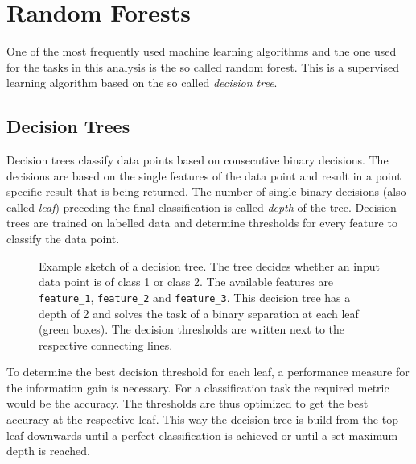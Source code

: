 \section{Random Forests}
%
One of the most frequently used machine learning algorithms and the one used
for the tasks in this analysis is the so called random forest. This is a
supervised learning algorithm based on the so called \textit{decision tree}.

\subsection{Decision Trees}
%
Decision trees classify data points based on consecutive binary decisions. The
decisions are based on the single features of the data point and result in a
point specific result that is being returned. The number of single binary
decisions (also called \textit{leaf}) preceding the final classification is
called \textit{depth} of the tree. Decision trees are trained on labelled data
and determine thresholds for every feature to classify the data point.
%
\begin{figure}[H]
  \centering
  \caption{Example sketch of a decision tree. The tree decides whether an input data point is of class 1 or class 2. The available features are \texttt{feature\_1}, \texttt{feature\_2} and \texttt{feature\_3}. This decision tree has a depth of 2 and solves the task of a binary separation at each leaf (green boxes). The decision thresholds are written next to the respective connecting lines.}
  \label{fig:tree}
\end{figure}
%
To determine the best decision threshold for each leaf, a performance measure
for the information gain is necessary. For a classification task the required
metric would be the accuracy. The thresholds are thus optimized to get the best
accuracy at the respective leaf. This way the decision tree is build from the
top leaf downwards until a perfect classification is achieved or until a set
maximum depth is reached.

